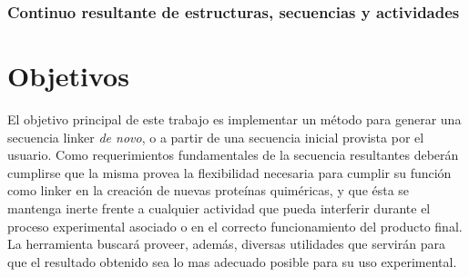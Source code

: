 % 







\subsubsection{Continuo resultante de estructuras, secuencias y actividades}





   
       
       
       

       
       
       
       
       
       
\section{Objetivos}


El objetivo principal de este trabajo es implementar un método para generar una secuencia linker \textit{de novo}, o a partir de una secuencia inicial provista por el usuario. 
Como requerimientos fundamentales de la secuencia resultantes deberán cumplirse que la misma provea la flexibilidad necesaria para cumplir su función como linker en la creación de nuevas proteínas quiméricas, 
y que ésta se mantenga inerte frente a cualquier actividad que pueda interferir durante el proceso experimental asociado o en el correcto funcionamiento del producto final.
La herramienta buscará proveer, además, diversas utilidades que servirán para que el resultado obtenido sea lo mas adecuado posible para su uso experimental. 


